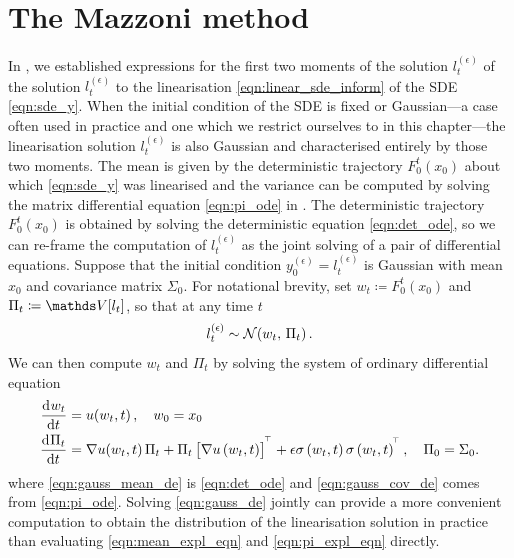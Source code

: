 \section{The Mazzoni method}\label{sec:mazzoni}
In , we established expressions for the first two moments of the solution \(l_t^{(\epsilon)}\) of the solution \(l_t^{(\epsilon)}\) to the linearisation \cref{eqn:linear_sde_inform} of the SDE \cref{eqn:sde_y}.
When the initial condition of the SDE is fixed or Gaussian---a case often used in practice and one which we restrict ourselves to in this chapter---the linearisation solution \(l_t^{(\epsilon)}\) is also Gaussian and characterised entirely by those two moments.
The mean is given by the deterministic trajectory \(F_0^t\!\left(x_0\right)\) about which \cref{eqn:sde_y} was linearised and the variance can be computed by solving the matrix differential equation \cref{eqn:pi_ode} in .
The deterministic trajectory \(F_0^t\!\left(x_0\right)\) is obtained by solving the deterministic equation \cref{eqn:det_ode}, so we can re-frame the computation of \(l_t^{(\epsilon)}\) as the joint solving of a pair of differential equations.
Suppose that the initial condition \(y_0^{(\epsilon)} = l_t^{(\epsilon)}\) is Gaussian with mean \(x_0\) and covariance matrix \(\Sigma_0\).
For notational brevity, set \(w_t \coloneqq F_0^t\!\left(x_0\right)\) and \(\Pi_t \coloneqq \var{l_t}\), so that at any time \(t\)
\[
	l_t^{(\epsilon)} \sim\mathcal{N}\!\left(w_t, \, \Pi_t\right).
\]
We can then compute \(w_t\) and \(\Pi_t\) by solving the system of ordinary differential equation
\begin{subequations}\label{eqn:gauss_de}
	\begin{align}
		\dod{w_t}{t}   & = u\!\left(w_t, t\right), \quad w_0 = x_0 \label{eqn:gauss_mean_de}                                                                                                                    \\
		\dod{\Pi_t}{t} & = \begin{multlined}[t]
			                   \nabla u\!\left(w_t, t\right) \Pi_t + \Pi_t\left[\nabla u\left(w_t, t\right)\right]^{\T} + \epsilon \sigma\left(w_t, t \right)\sigma\left(w_t, t\right)^{\T}, \quad \Pi_0 = \Sigma_0.
		                   \end{multlined}
		\label{eqn:gauss_cov_de}
	\end{align}
\end{subequations}
where \cref{eqn:gauss_mean_de} is \cref{eqn:det_ode} and \cref{eqn:gauss_cov_de} comes from \cref{eqn:pi_ode}.
Solving \cref{eqn:gauss_de} jointly can provide a more convenient computation to obtain the distribution of the linearisation solution in practice than evaluating \cref{eqn:mean_expl_eqn} and \cref{eqn:pi_expl_eqn} directly.

